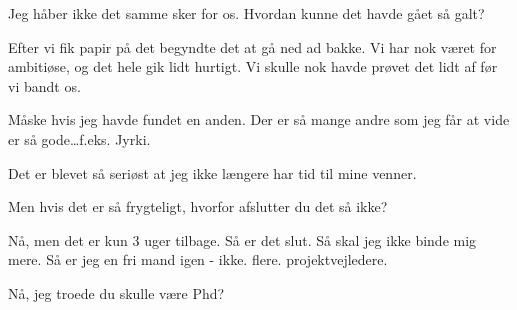 \documentclass[a4paper,11pt]{article}
\begin{document}
\begin{sketch}

 Jeg håber ikke det samme sker for os. Hvordan kunne det havde gået så galt?
 
 Efter vi fik papir på det begyndte det at gå ned ad bakke. Vi har nok været for ambitiøse, og det hele gik lidt hurtigt. Vi skulle nok havde prøvet det lidt af før vi bandt os. 

Måske hvis jeg havde fundet en anden.  Der er så mange andre som jeg får at vide er så gode\ldots f.eks. Jyrki.

Det er blevet så seriøst at jeg ikke længere har tid til mine venner.

 Men hvis det er så frygteligt, hvorfor afslutter du det så ikke?

 Nå, men det er kun 3 uger tilbage. Så er det slut. Så skal
jeg ikke binde mig mere. Så er jeg en fri mand igen -
ikke. flere. projektvejledere.


 Nå, jeg troede du skulle være Phd?



\end{sketch}
\end{document}
